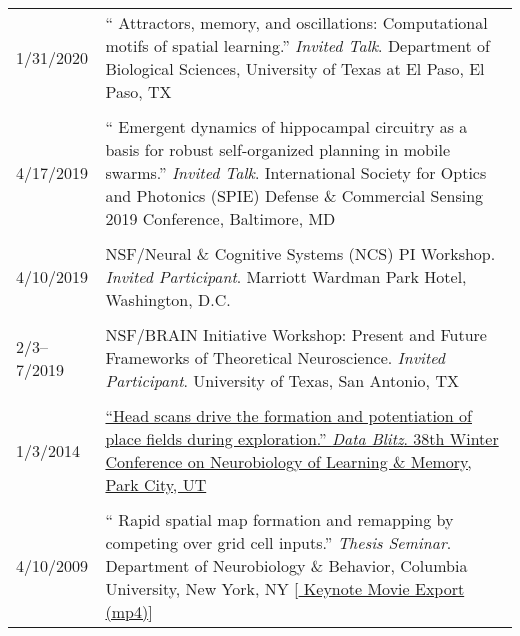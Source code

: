 \documentclass[10pt]{article}
\newcommand{\itemtitle}[1]{{\color{hopkinsblue}\ul{#1}}}
\newcommand{\unpubtitle}[1]{{\color{hopkinsblue} #1}}
\begin{document}
\begin{longtable}{@{\hspace{0.1in}}l>{\raggedright\arraybackslash}p{}}
  \tabularnewline
  1/31/2020 & ``\unpubtitle{Attractors, memory, and oscillations:
  Computational motifs of spatial learning}.'' \emph{Invited Talk}.
  Department of Biological Sciences, University of Texas at El Paso, El Paso, TX \\
  \tabularnewline
  4/17/2019 & ``\unpubtitle{Emergent dynamics of hippocampal
  circuitry as a basis for robust self-organized planning in mobile swarms}.''
  \emph{Invited Talk}. International Society for Optics and Photonics (SPIE)
  Defense \& Commercial Sensing 2019 Conference, Baltimore, MD \\
  \tabularnewline
  4/10/2019 & NSF/Neural \& Cognitive Systems (NCS) PI
  Workshop. \emph{Invited Participant}. Marriott Wardman Park Hotel, Washington, D.C. \\
  \tabularnewline
  2/3--7/2019 \hspace{0.1in} & NSF/BRAIN Initiative Workshop: Present and Future Frameworks
  of Theoretical Neuroscience. \emph{Invited Participant}. University of Texas,
  San Antonio, TX \\
  \tabularnewline
  1/3/2014 & \href{https://jdmonaco.com/files/ScanningSlide.pdf}
  {``\itemtitle{Head scans drive the formation and potentiation of place
  fields during exploration}.'' \emph{Data Blitz}. 38th Winter Conference on
  Neurobiology of Learning \& Memory, Park City, UT} \\
  \tabularnewline
  4/10/2009 & ``\unpubtitle{Rapid spatial map formation and remapping by
  competing over grid cell inputs}.'' \emph{Thesis Seminar}. Department of
  Neurobiology \& Behavior, Columbia University, New York, NY 
  [\href{https://jdmonaco.com/files/monaco-2009-thesis-seminar-Keynote.mp4}
  {\unpubtitle{Keynote Movie Export (mp4)}}] \\
\end{longtable}

\end{document}
